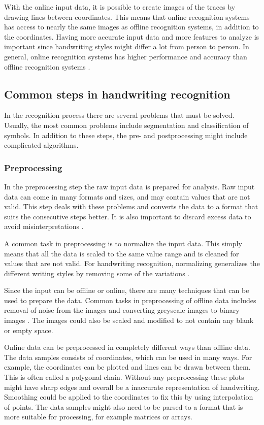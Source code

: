 With the online input data, it is possible to create images of the traces by drawing lines between coordinates. This means that online recognition systems has access to nearly the same images as offline recognition systems, in addition to the coordinates. Having more accurate input data and more features to analyze is important since handwriting styles might differ a lot from person to person. In general, online recognition systems has higher performance and accuracy than offline recognition systems \parencite{priya_online_2016}.

\subsection{Common steps in handwriting recognition}

In the recognition process there are several problems that must be solved. Usually, the most common problems include segmentation and classification of symbols. In addition to these steps, the pre- and postprocessing might include complicated algorithms.

\subsubsection{Preprocessing}

In the preprocessing step the raw input data is prepared for analysis. Raw input data can come in many formats and sizes, and may contain values that are not valid. This step deals with these problems and converts the data to a format that suits the consecutive steps better. It is also important to discard excess data to avoid misinterpretations \parencite{huang_preprocessing_2007}.

A common task in preprocessing is to normalize the input data. This simply means that all the data is scaled to the same value range and is cleaned for values that are not valid. For handwriting recognition, normalizing generalizes the different writing styles by removing some of the variations \parencite{huang_preprocessing_2007}.

Since the input can be offline or online, there are many techniques that can be used to prepare the data. Common tasks in preprocessing of offline data includes removal of noise from the images and converting greyscale images to binary images \cite{priya_online_2016}. The images could also be scaled and modified to not contain any blank or empty space.

Online data can be preprocessed in completely different ways than offline data. The data samples consists of coordinates, which can be used in many ways. For example, the coordinates can be plotted and lines can be drawn between them. This is often called a polygonal chain. Without any preprocessing these plots might have sharp edges and overall be a inaccurate representation of handwriting. Smoothing could be applied to the coordinates to fix this by using interpolation of points. The data samples might also need to be parsed to a format that is more suitable for processing, for example matrices or arrays.

